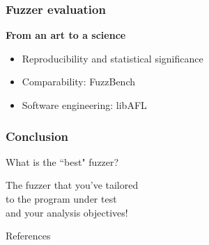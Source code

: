 \documentclass{beamer}
\begin{document}
\begin{frame}
	\frametitle{Fuzzer evaluation}
	\textbf{From an art to a science}

	\begin{itemize}
		\item{Reproducibility and statistical significance \cite{klees, seedselection}}
		\item{Comparability: FuzzBench \cite{fuzzbench}}
		\item{Software engineering: libAFL \cite{libafl}}
	\end{itemize}
	
\end{frame}

\begin{frame}
	\frametitle{Conclusion}

	\centering
	\LARGE{What is the ``best" fuzzer?}
	
	\vspace{\baselineskip}
	\pause
	\LARGE{The fuzzer that you've tailored \\to the program under test \\and your analysis objectives!} 
\end{frame}

\appendix
\begin{frame}[allowframebreaks]{References}
	\def\newblock{}
	
	
\end{frame}
\end{document}
